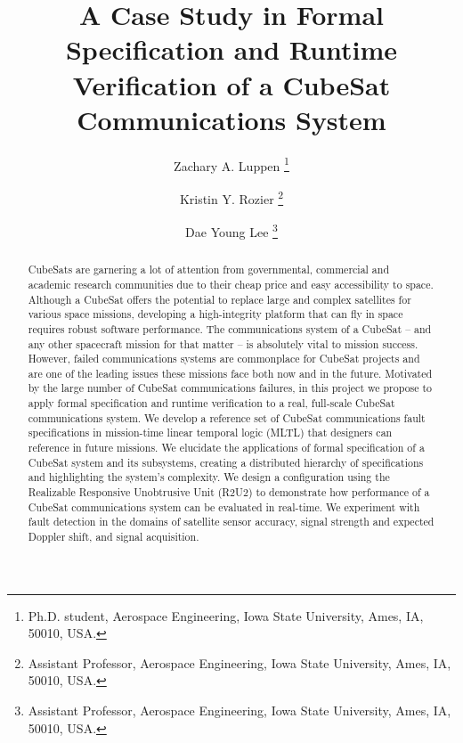 \documentclass[conf]{new-aiaa}
\title{A Case Study in Formal Specification and Runtime Verification of a CubeSat Communications System}
\author{Zachary A. Luppen \footnote{Ph.D. student, Aerospace Engineering, Iowa State University, Ames, IA, 50010, USA.}}
\author{Kristin Y. Rozier \footnote{Assistant Professor, Aerospace Engineering, Iowa State University, Ames, IA, 50010, USA.}}
\author{Dae Young Lee \footnote{Assistant Professor, Aerospace Engineering, Iowa State University, Ames, IA, 50010, USA.}}
\affil{Iowa State University, Ames, Iowa, 50011, USA.}
\begin{document}
\maketitle

\begin{abstract}

CubeSats are garnering a lot of attention from governmental, commercial and academic research communities due to their cheap price and easy accessibility to space. Although a CubeSat offers the potential to replace large and complex satellites for various space missions, developing a high-integrity platform that can fly in space requires robust software performance. The communications system of a CubeSat -- and any other spacecraft mission for that matter -- is absolutely vital to mission success. However, failed communications systems are commonplace for CubeSat projects and are one of the leading issues these missions face both now and in the future. Motivated by the large number of CubeSat communications failures, in this project we propose to apply formal specification and runtime verification to a real, full-scale CubeSat communications system. We develop a reference set of CubeSat communications fault specifications in mission-time linear temporal logic (MLTL) that designers can reference in future missions. We elucidate the applications of formal specification of a CubeSat system and its subsystems, creating a distributed hierarchy of specifications and highlighting the system's complexity. We design a configuration using the Realizable Responsive Unobtrusive Unit (R2U2) to demonstrate how performance of a CubeSat communications system can be evaluated in real-time. We experiment with fault detection in the domains of satellite sensor accuracy, signal strength and expected Doppler shift, and signal acquisition.



\end{abstract}
\end{document}
